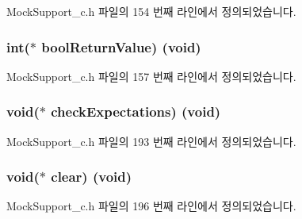 Mock\+Support\+\_\+c.\+h 파일의 154 번째 라인에서 정의되었습니다.

\subsubsection[{\texorpdfstring{bool\+Return\+Value}{boolReturnValue}}]{\setlength{\rightskip}{0pt plus 5cm}int($\ast$ bool\+Return\+Value) (void)}\hypertarget{struct_s_mock_support__c_a5eef7e37626ba5f69b251748055a97e6}{}\label{struct_s_mock_support__c_a5eef7e37626ba5f69b251748055a97e6}


Mock\+Support\+\_\+c.\+h 파일의 157 번째 라인에서 정의되었습니다.

\subsubsection[{\texorpdfstring{check\+Expectations}{checkExpectations}}]{\setlength{\rightskip}{0pt plus 5cm}void($\ast$ check\+Expectations) (void)}\hypertarget{struct_s_mock_support__c_adb505c8f6e84105c5620d0913e648eb5}{}\label{struct_s_mock_support__c_adb505c8f6e84105c5620d0913e648eb5}


Mock\+Support\+\_\+c.\+h 파일의 193 번째 라인에서 정의되었습니다.

\subsubsection[{\texorpdfstring{clear}{clear}}]{\setlength{\rightskip}{0pt plus 5cm}void($\ast$ clear) (void)}\hypertarget{struct_s_mock_support__c_a4bc6cb947c21b1928175ae1177e38dc7}{}\label{struct_s_mock_support__c_a4bc6cb947c21b1928175ae1177e38dc7}


Mock\+Support\+\_\+c.\+h 파일의 196 번째 라인에서 정의되었습니다.

